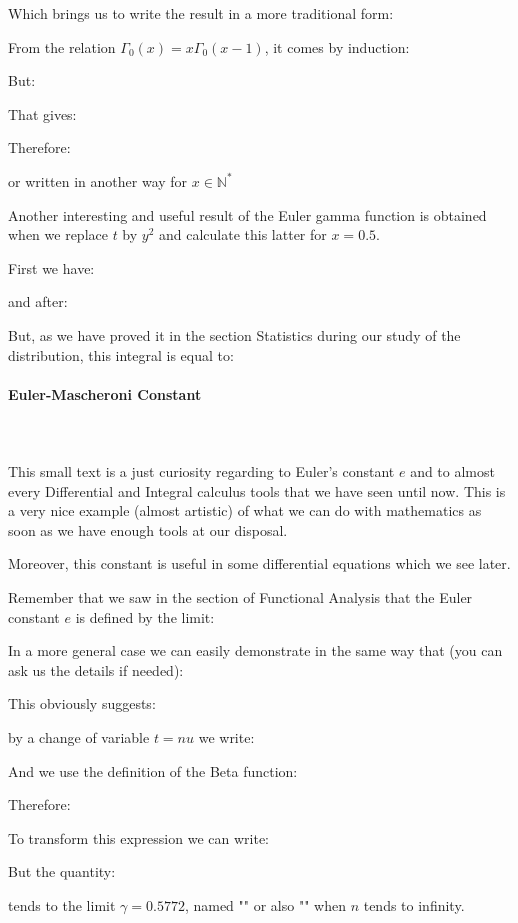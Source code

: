 	Which brings us to write the result in a more traditional form:
	
	From the relation $\Gamma_{0}(x)=x\Gamma_{0}(x-1)$, it comes by induction:
	
	But:
	
	That gives:
	
	Therefore:
	
	or written in another way for $x\in \mathbb{N}^*$
	
	Another interesting and useful result of the Euler gamma function is obtained when we replace $t$ by $y^2$ and calculate this latter for $x=0.5$.
	
	First we have:
	
	and after:
	
	But, as we have proved it in the section Statistics during our study of  the distribution, this integral is equal to:
	
	
	\pagebreak
	\paragraph{Euler-Mascheroni Constant}\mbox{}\\\\
	This small text is a just curiosity regarding to Euler's constant $e$ and to almost every Differential and Integral calculus tools that we have seen until now. This is a very nice example (almost artistic) of what we can do with mathematics as soon as we have enough tools at our disposal.
	
	Moreover, this constant is useful in some differential equations which we see later.
	
	Remember that we saw in the section of Functional Analysis that the Euler constant $e$ is defined by the limit:
	
	
	In a more general case we can easily demonstrate in the same way that (you can ask us the details if needed):	
	
	This obviously suggests:
	
	by a change of variable $t=nu$ we write:
	
	And we use the definition of the Beta function:
	
	Therefore:
	
	To transform this expression we can write:
	
	But the quantity:
	
	tends to the limit $\gamma=0.5772$, named "" or also "" when $n$ tends to infinity.
	

